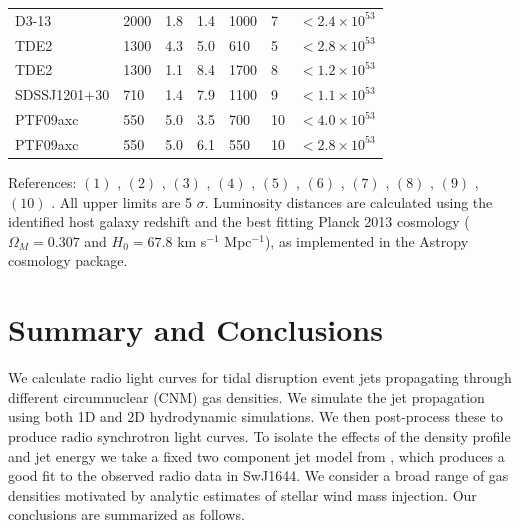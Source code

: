 \documentclass[usenatbib,fleqn]{mnras}
\begin{document}
\begin{table}
\begin{threeparttable}
\begin{tabular*}{1.5\columnwidth}{lllllll}
D3-13 & 2000 & 1.8 & 1.4 & 1000 & 7 & $< 2.4 \times 10^{ 53 }$ \\
TDE2 & 1300 & 4.3 & 5.0 & 610 & 5 & $< 2.8 \times 10^{ 53 }$ \\
TDE2 & 1300 & 1.1 & 8.4 & 1700 & 8 & $< 1.2 \times 10^{ 53 }$ \\
SDSSJ1201+30 & 710 & 1.4 & 7.9 & 1100 & 9 & $< 1.1 \times 10^{ 53 }$ \\
PTF09axc & 550 & 5.0 & 3.5 & 700 & 10 & $< 4.0 \times 10^{ 53 }$ \\
PTF09axc & 550 & 5.0 & 6.1 & 550 & 10 & $< 2.8 \times 10^{ 53 }$\\
\end{tabular*}
\begin{tablenotes}
\item References: $(1)$ \citet{Alexander+2015, van-Velzen+2015}, $(2)$
  \citet{Berger+2012, Zauderer+2013} , $(3)$ \citet{Cenko+2012}, $(4)$
  \citet{Bower+2013}, $(5)$ \citet{van-Velzen+2013}, $(6)$
  \citet{Bade+1996, Komossa&Dahlem2001}, $(7)$
  \citet{Gezari+2008,Bower+2011}, $(8)$ \citet{van-Velzen+2011}, $(9)$
  \citet{Saxton+2012}, $(10)$ \citet{Arcavi+2014}. All upper limits
  are 5 $\sigma$. Luminosity distances are calculated using the
  identified host galaxy redshift and the best fitting Planck
  2013 cosmology ($\Omega_M=0.307$ and $H_0=67.8$ km s$^{-1}$
  Mpc$^{-1}$), as implemented in the Astropy cosmology package.
\end{tablenotes}
\end{threeparttable}
\end{table}

\section{Summary and Conclusions}
\label{sec:conc}

We calculate radio light curves for tidal disruption event jets
propagating through different circumnuclear (CNM) gas densities. We
simulate the jet propagation using both 1D and 2D hydrodynamic
simulations. We then post-process these to produce radio synchrotron
light curves. To isolate the effects of the density profile and jet
energy we take a fixed two component jet model from
\citet{Mimica+2015}, which produces a good fit to the observed radio
data in SwJ1644. We consider a broad range of gas densities motivated
by analytic estimates of stellar wind mass injection. Our conclusions
are summarized as follows.
\end{document}
